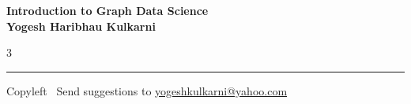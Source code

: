 \documentclass[8pt,landscape]{article}
\begin{document}
\footnotesize


\begin{center}
\Large{\textbf{Introduction to Graph Data Science\\ Yogesh Haribhau Kulkarni}}
\end{center}

\begin{multicols}{3}

\end{multicols}

\rule{\linewidth}{0.25pt}
\scriptsize
Copyleft \textcopyleft\  Send suggestions to
\href{http://www.yogeshkulkarni.com}{yogeshkulkarni@yahoo.com}
\end{document}
